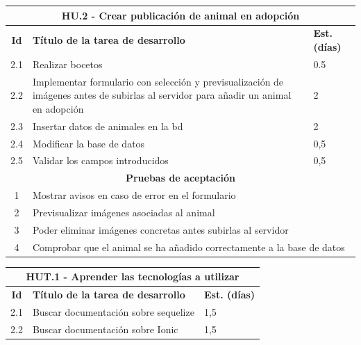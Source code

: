 \label{sec:hu1}
\begin{table}[H]
	\centering
	\hspace*{-0.5cm}
\begin{tabular}{|c|p{9.5cm}|p{1cm}|}
	\hline
	\multicolumn{3}{|c|}{\textbf{HU.2 - Crear publicación de animal en adopción}} \\
	\hline
	\textbf{Id} & \textbf{Título de la tarea de desarrollo} & \textbf{Est. (días)} \\ %
	\hline
	2.1 & Realizar bocetos & 0.5 \\ \hline
	2.2 &  Implementar formulario con selección y previsualización de imágenes antes de subirlas al servidor para añadir un animal en adopción & 2 \\ \hline
	2.3 &  Insertar datos de animales en la bd & 2 \\ \hline
	2.4 & Modificar la base de datos & 0,5 \\ \hline
	2.5 & Validar los campos introducidos & 0,5 \\ \hline
	\multicolumn{3}{|c|}{\textbf{Pruebas de aceptación}} \\ \hline
	1 & \multicolumn{2}{|l|}{Mostrar avisos en caso de error en el formulario} \\ \hline
	2 & \multicolumn{2}{|l|}{Previsualizar imágenes asociadas al animal} \\ \hline
	3 & \multicolumn{2}{|l|}{Poder eliminar imágenes concretas antes subirlas al servidor} \\\hline
	4 & \multicolumn{2}{|l|}{Comprobar que el animal se ha añadido correctamente a la base de datos} \\\hline
	
\end{tabular}
\end{table}


\begin{tabular}{|c|p{9.5cm}|p{1cm}|}
	\hline
	\multicolumn{3}{|c|}{\textbf{HUT.1 - Aprender las tecnologías a utilizar}} \\
	\hline
	\textbf{Id} & \textbf{Título de la tarea de desarrollo} & \textbf{Est. (días)} \\
	\hline
	2.1 & Buscar documentación sobre sequelize & 1,5 \\ \hline
	2.2 & Buscar documentación sobre Ionic & 1,5 \\ \hline
\end{tabular} \\ \\


